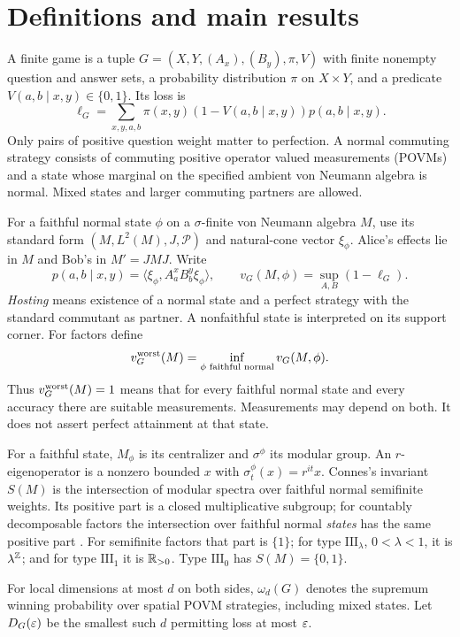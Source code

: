 \section{Definitions and main results}\label{sec:definitions}
A finite game is a tuple $G=(X,Y,(A_x),(B_y),\pi,V)$ with finite nonempty question and answer sets, a probability distribution $\pi$ on $X\times Y$, and a predicate $V(a,b\mid x,y)\in\{0,1\}$. Its loss is
\[
 \ell_G=\sum_{x,y,a,b}\pi(x,y)(1-V(a,b\mid x,y))p(a,b\mid x,y).
\]
Only pairs of positive question weight matter to perfection. A normal commuting strategy consists of commuting positive operator valued measurements (POVMs) and a state whose marginal on the specified ambient von Neumann algebra is normal. Mixed states and larger commuting partners are allowed.

For a faithful normal state $\phi$ on a $\sigma$-finite von Neumann algebra $M$, use its standard form $(M,L^2(M),J,\mathcal P)$ and natural-cone vector $\xi_\phi$. Alice's effects lie in $M$ and Bob's in $M'=JMJ$. Write
\[
 p(a,b\mid x,y)=\langle\xi_\phi,A_a^xB_b^y\xi_\phi\rangle,
 \qquad v_G(M,\phi)=\sup_{A,B}(1-\ell_G).
\]
\emph{Hosting} means existence of a normal state and a perfect strategy with the standard commutant as partner. A nonfaithful state is interpreted on its support corner. For factors define
\[
 v^{\mathrm{worst}}_G(M)=\inf_{\phi\text{ faithful normal}}v_G(M,\phi).
\]
Thus $v^{\mathrm{worst}}_G(M)=1$ means that for every faithful normal state and every accuracy there are suitable measurements. Measurements may depend on both. It does not assert perfect attainment at that state.

For a faithful state, $M_\phi$ is its centralizer and $\sigma^\phi$ its modular group. An $r$-eigenoperator is a nonzero bounded $x$ with $\sigma_t^\phi(x)=r^{it}x$. Connes's invariant $S(M)$ is the intersection of modular spectra over faithful normal semifinite weights. Its positive part is a closed multiplicative subgroup; for countably decomposable factors the intersection over faithful normal \emph{states} has the same positive part \cite{Connes}. For semifinite factors that part is $\{1\}$; for type $\mathrm{III}_\lambda$, $0<\lambda<1$, it is $\lambda^\mathbb Z$; and for type $\mathrm{III}_1$ it is $\mathbb R_{>0}$. Type $\mathrm{III}_0$ has $S(M)=\{0,1\}$.

For local dimensions at most $d$ on both sides, $\omega_d(G)$ denotes the supremum winning probability over spatial POVM strategies, including mixed states. Let $D_G(\varepsilon)$ be the smallest such $d$ permitting loss at most $\varepsilon$.

